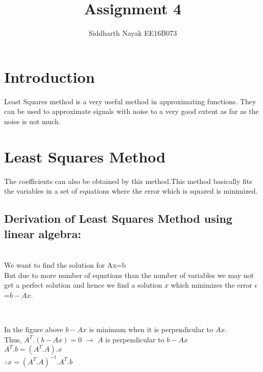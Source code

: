 \documentclass[11pt]{article}
\title{Assignment 4}
\author{Siddharth Nayak EE16B073}
\begin{document}
    
    
    \maketitle
    
    

    
    \hypertarget{introduction}{%
\section{Introduction}\label{introduction}}

Least Squares method is a very useful method in approximating functions.
They can be used to approximate signals with noise to a very good extent
as far as the noise is not much.

    \hypertarget{least-squares-method}{%
\section{Least Squares Method}\label{least-squares-method}}

The coefficients can also be obtained by this method.This method
basically fits the variables in a set of equations where the error which
is squared is minimized. \\
\subsection{Derivation of Least Squares Method using linear algebra: }
 \\We want to find the solution for Ax=b \\But due to more
number of equations than the number of variables we may not get a
perfect solution and hence we find a solution \(x\) which minimizes the
error \(\epsilon\)=\(b-Ax\).

      
    \begin{center}
    \end{center}
    { \hspace*{\fill} \\}
    

    In the figure above \(b-Ax\) is minimum when it is perpendicular to
\(Ax\). \\Thus, \(A^T.(b-Ax)=0\) \(\longrightarrow\) \(A\) is
perpendicular to \(b-Ax\)\\ \(A^T.b=(A^T.A).x\)\\
\(\therefore x=(A^T.A)^{-1}.A^T.b\)
\end{document}
